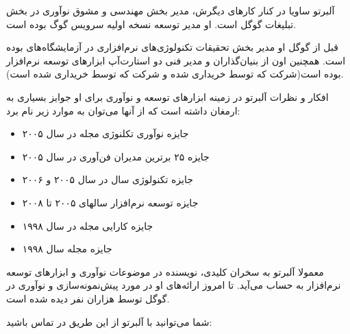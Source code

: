 آلبرتو ساویا در کنار کارهای دیگرش، مدیر بخش مهندسی و مشوق نوآوری در بخش
تبلیغات گوگل است. او مدیر توسعه نسخه اولیه سرویس  گوگ بوده
است.

قبل از گوگل او مدیر بخش تحقیقات تکنولوژی‌های نرم‌افزاری در آزمایشگاه‌های
  بوده است. همچنین اون از بنیان‌گذاران و مدیر
فنی دو استارت‌آپ ابزارهای توسعه نرم‌افزار بوده است(شرکت  که
توسط   خریداری شده و شرکت 
 که توسط  خریداری شده است).

افکار و نظرات آلبرتو در زمینه ابزارهای توسعه و نوآوری برای او جوایز
بسیاری به ارمغان داشته است که از آنها می‌توان به موارد زیر نام برد:

\begin{itemize}

\item
  جایزه نوآوری تکلنوژی مجله    
  در سال ۲۰۰۵
\item
  جایزه ۲۵ برترین مدیران فن‌آوری  در سال ۲۰۰۵
\item
  جایزه تکنولوژی سال  در سال ۲۰۰۵ و ۲۰۰۶
\item
  جایزه توسعه نرم‌افزار  سالهای ۲۰۰۵ تا ۲۰۰۸
\item
  جایزه کارایی مجله   در سال ۱۹۹۸
\item
  جایزه   مجله   سال ۱۹۹۸
\end{itemize}

معمولا آلبرتو به سخران کلیدی، نویسنده در موضوعات نوآوری و ابزارهای توسعه
نرم‌افزار به حساب می‌آید. تا امروز ارائه‌های او در مورد پیش‌نمونه‌سازی و
نوآوری در گوگل توسط هزاران نفر دیده شده است.

شما می‌توانید با آلبرتو از این طریق در تماس باشید:
